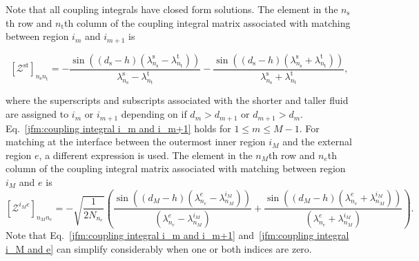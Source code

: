 Note that all coupling integrals have closed form solutions. The element in the $n_\mathrm{s}$th row and $n_\mathrm{t}$th column of the coupling integral matrix associated with matching between region $i_m$ and $i_{m+1}$ is

\begin{equation}\label{jfm:coupling integral i_m and i_m+1}
    [\boldsymbol{\mathcal{Z}}^{\text{s} \text{t}} ]_{n_\mathrm{s}n_\mathrm{t}}=-\frac{\sin ((d_\text{s}-h) (\lambda_{n_\mathrm{s}}^{\text{s}}-\lambda_{n_\mathrm{t}}^{\text{t}}))}{\lambda_{n_\mathrm{s}}^{\text{s}}-\lambda_{n_\mathrm{t}}^{\text{t}}}-\frac{\sin ((d_\text{s}-h) (\lambda_{n_\mathrm{s}}^{\text{s}}+\lambda_{n_\mathrm{t}}^{\text{t}}))}{\lambda_{n_\mathrm{s}}^{\text{s}}+\lambda_{n_\mathrm{t}}^{\text{t}}},
\end{equation}

\noindent where the superscripts and subscripts associated with the shorter and taller fluid are assigned to $i_m$ or $i_{m+1}$ depending on if $d_m>d_{m+1}$ or $d_{m+1}>d_m$. Eq.~\ref{jfm:coupling integral i_m and i_m+1} holds for $1 \le m \le M-1$. For matching at the interface between the outermost inner region $i_M$ and the external region $e$, a different expression is used. The element in the $n_M$th row and $n_e$th column of the coupling integral matrix associated with matching between region $i_M$ and $e$ is
\begin{equation}\label{jfm:coupling integral i_M and e}
    [\boldsymbol{\mathcal{Z}}^{i_M e} ]_{n_Mn_e}=
    - \sqrt{\frac{1}{2N_{n_e}}} 
    \left( 
        \frac{\sin ((d_M-h) (\lambda_{n_e}^{e}-\lambda_{n_M}^{i_M}))}
        {(\lambda_{n_e}^{e}-\lambda_{n_M}^{i_M})} 
        + \frac{\sin ((d_M-h) (\lambda_{n_e}^{e}+\lambda_{n_M}^{i_M}))}
        {(\lambda_{n_e}^{e}+\lambda_{n_M}^{i_M})}
    \right).
\end{equation}
Note that Eq.~\ref{jfm:coupling integral i_m and i_m+1} and~\ref{jfm:coupling integral i_M and e} can simplify considerably when one or both indices are zero. 








